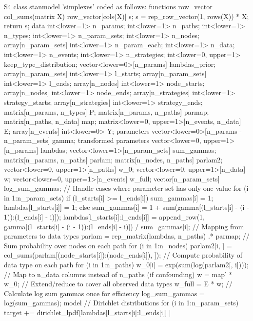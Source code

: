 \documentclass[
  11pt,
  article]{jss}
\begin{document}
\begin{CodeChunk}
\begin{CodeOutput}
S4 class stanmodel 'simplexes' coded as follows:
functions {
  row_vector col_sums(matrix X) {
    row_vector[cols(X)] s;
    s = rep_row_vector(1, rows(X)) * X;
    return s;
  }
}
data {
  int<lower=1> n_params;
  int<lower=1> n_paths;
  int<lower=1> n_types;
  int<lower=1> n_param_sets;
  int<lower=1> n_nodes;
  array[n_param_sets] int<lower=1> n_param_each;
  int<lower=1> n_data;
  int<lower=1> n_events;
  int<lower=1> n_strategies;
  int<lower=0, upper=1> keep_type_distribution;
  vector<lower=0>[n_params] lambdas_prior;
  array[n_param_sets] int<lower=1> l_starts;
  array[n_param_sets] int<lower=1> l_ends;
  array[n_nodes] int<lower=1> node_starts;
  array[n_nodes] int<lower=1> node_ends;
  array[n_strategies] int<lower=1> strategy_starts;
  array[n_strategies] int<lower=1> strategy_ends;
  matrix[n_params, n_types] P;
  matrix[n_params, n_paths] parmap;
  matrix[n_paths, n_data] map;
  matrix<lower=0, upper=1>[n_events, n_data] E;
  array[n_events] int<lower=0> Y;
}
parameters {
  vector<lower=0>[n_params - n_param_sets] gamma;
}
transformed parameters {
  vector<lower=0, upper=1>[n_params] lambdas;
  vector<lower=1>[n_param_sets] sum_gammas;
  matrix[n_params, n_paths] parlam;
  matrix[n_nodes, n_paths] parlam2;
  vector<lower=0, upper=1>[n_paths] w_0;
  vector<lower=0, upper=1>[n_data] w;
  vector<lower=0, upper=1>[n_events] w_full;
  vector[n_param_sets] log_sum_gammas;
  // Handle cases where parameter set has only one value
  for (i in 1:n_param_sets) {
    if (l_starts[i] >= l_ends[i]) {
      sum_gammas[i] = 1;
      lambdas[l_starts[i]] = 1;
    } else {
      sum_gammas[i] = 1 + sum(gamma[(l_starts[i] - (i - 1)):(l_ends[i] - i)]);
      lambdas[l_starts[i]:l_ends[i]] =
        append_row(1, gamma[(l_starts[i] - (i - 1)):(l_ends[i] - i)]) /
        sum_gammas[i];
    }
  }
  // Mapping from parameters to data types
  parlam = rep_matrix(lambdas, n_paths) .* parmap;
  // Sum probability over nodes on each path
  for (i in 1:n_nodes) {
    parlam2[i, ] = col_sums(parlam[(node_starts[i]):(node_ends[i]), ]);
  }
  // Compute probability of data type on each path
  for (i in 1:n_paths) {
    w_0[i] = exp(sum(log(parlam2[, i])));
  }
  // Map to n_data columns instead of n_paths (if confounding)
  w = map' * w_0;
  // Extend/reduce to cover all observed data types
  w_full = E * w;
  // Calculate log sum gammas once for efficiency
  log_sum_gammas = log(sum_gammas);
}
model {
  // Dirichlet distributions
  for (i in 1:n_param_sets) {
    target += dirichlet_lpdf(lambdas[l_starts[i]:l_ends[i]] |
}}
\end{CodeOutput}
\end{CodeChunk}
\end{document}

